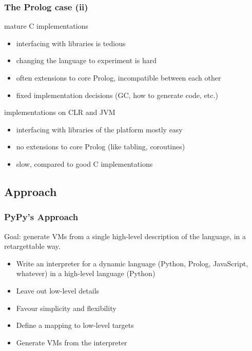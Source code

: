 \documentclass[utf8]{beamer}
\begin{document}
\begin{frame}
  \frametitle{The Prolog case (ii)}
  \begin{block}{mature C implementations}
    \begin{itemize}
    \item
      interfacing with libraries is tedious
    \item
      changing the language to experiment is hard
    \item
      often extensions to core Prolog, incompatible between each other
    \item
      fixed implementation decisions (GC, how to generate code, etc.)
    \end{itemize}
  \end{block}
  \begin{block}{implementations on CLR and JVM}
    \begin{itemize}
    \item
      interfacing with libraries of the platform mostly easy
    \item
      no extensions to core Prolog (like tabling, coroutines)
    \item
      slow, compared to good C implementations
    \end{itemize}
  \end{block}
\end{frame}



\subsection{Approach}
\begin{frame}
  \frametitle{PyPy's Approach}
    \alert{Goal:} generate VMs from a single high-level description of the
     language, in a retargettable way.
  \begin{itemize}
  \item
    Write an  interpreter for a dynamic language (Python, Prolog, JavaScript,
    whatever) in a high-level language (Python)
  \item
    Leave out low-level details
  \item
    Favour simplicity and flexibility
  \item
    Define a mapping to low-level targets
  \item
    Generate VMs from the interpreter
  \end{itemize}
\end{frame}
\end{document}
